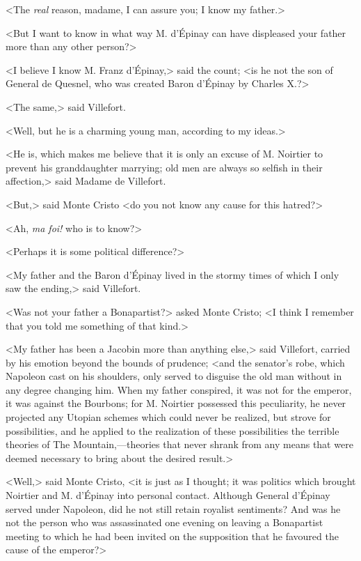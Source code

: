  <The \textit{real} reason, madame, I can assure you; I know my father.> 

 <But I want to know in what way M. d'Épinay can have displeased your father more than any other person?> 

 <I believe I know M. Franz d'Épinay,> said the count; <is he not the son of General de Quesnel, who was created Baron d'Épinay by Charles X.?> 

 <The same,> said Villefort. 

 <Well, but he is a charming young man, according to my ideas.> 

 <He is, which makes me believe that it is only an excuse of M. Noirtier to prevent his granddaughter marrying; old men are always so selfish in their affection,> said Madame de Villefort. 

 <But,> said Monte Cristo <do you not know any cause for this hatred?> 

 <Ah, \textit{ma foi!} who is to know?> 

 <Perhaps it is some political difference?> 

 <My father and the Baron d'Épinay lived in the stormy times of which I only saw the ending,> said Villefort. 

 <Was not your father a Bonapartist?> asked Monte Cristo; <I think I remember that you told me something of that kind.> 

 <My father has been a Jacobin more than anything else,> said Villefort, carried by his emotion beyond the bounds of prudence; <and the senator's robe, which Napoleon cast on his shoulders, only served to disguise the old man without in any degree changing him. When my father conspired, it was not for the emperor, it was against the Bourbons; for M. Noirtier possessed this peculiarity, he never projected any Utopian schemes which could never be realized, but strove for possibilities, and he applied to the realization of these possibilities the terrible theories of The Mountain,—theories that never shrank from any means that were deemed necessary to bring about the desired result.> 

 <Well,> said Monte Cristo, <it is just as I thought; it was politics which brought Noirtier and M. d'Épinay into personal contact. Although General d'Épinay served under Napoleon, did he not still retain royalist sentiments? And was he not the person who was assassinated one evening on leaving a Bonapartist meeting to which he had been invited on the supposition that he favoured the cause of the emperor?> 


